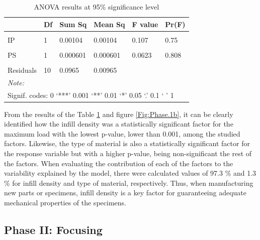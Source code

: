 \documentclass[]{interact}
\theoremstyle{plain}%
\theoremstyle{definition}
\theoremstyle{remark}
\begin{document}
\begin{table}

\caption{\label{tab:Table.Anova.fase1}ANOVA results at 95\% significance level \label{tab:anova.phase1}}
\centering
\begin{tabular}[t]{llllll}
\toprule
  & Df & Sum Sq & Mean Sq & F value & Pr(F)\\
\midrule
\cellcolor{gray!6}{LH} & \cellcolor{gray!6}{1} & \cellcolor{gray!6}{0.0129} & \cellcolor{gray!6}{0.0129} & \cellcolor{gray!6}{1.34} & \cellcolor{gray!6}{0.274}\\
IP & 1 & 0.00104 & 0.00104 & 0.107 & 0.75\\
\cellcolor{gray!6}{ID} & \cellcolor{gray!6}{1} & \cellcolor{gray!6}{7.96} & \cellcolor{gray!6}{7.96} & \cellcolor{gray!6}{825} & \cellcolor{gray!6}{6.1e-11***}\\
PS & 1 & 0.000601 & 0.000601 & 0.0623 & 0.808\\
\cellcolor{gray!6}{Material} & \cellcolor{gray!6}{1} & \cellcolor{gray!6}{0.106} & \cellcolor{gray!6}{0.106} & \cellcolor{gray!6}{11} & \cellcolor{gray!6}{0.00788**}\\
Residuals & 10 & 0.0965 & 0.00965 &  & \\
\bottomrule
\multicolumn{6}{l}{\rule{0pt}{1em}\textit{Note: }}\\
\multicolumn{6}{l}{\rule{0pt}{1em}Signif. codes:  0 ‘***’ 0.001 ‘**’ 0.01 ‘*’ 0.05 ‘.’ 0.1 ‘ ’ 1}\\
\end{tabular}
\end{table}

From the results of the Table \ref{tab:anova.phase1} and figure
\ref{Fig:Phase.1b}, it can be clearly identified how the infill density
was a statistically significant factor for the maximum load with the
lowest p-value, lower than 0.001, among the studied factors. Likewise,
the type of material is also a statistically significant factor for the
response variable but with a higher p-value, being non-significant the
rest of the factors. When evaluating the contribution of each of the
factors to the variability explained by the model, there were calculated
values of 97.3 \% and 1.3 \% for infill density and type of material,
respectively. Thus, when manufacturing new parts or specimens, infill
density is a key factor for guaranteeing adequate mechanical properties
of the specimens.

\hypertarget{phase-ii-focusing}{%
\subsection{Phase II: Focusing}\label{phase-ii-focusing}}
\end{document}
